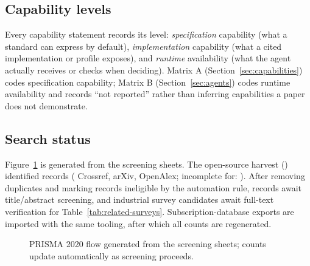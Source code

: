 \subsection{Capability levels}
Every capability statement records its level: \emph{specification} capability (what a
standard can express by default), \emph{implementation} capability (what a cited
implementation or profile exposes), and \emph{runtime} availability (what the agent
actually receives or checks when deciding). Matrix A (Section~\ref{sec:capabilities}) codes
specification capability; Matrix B (Section~\ref{sec:agents}) codes runtime availability
and records ``not reported'' rather than inferring capabilities a paper does not
demonstrate.

\subsection{Search status}
Figure~\ref{fig:prisma} is generated from the screening sheets. The open-source harvest
(\SurveyHarvestDate{}) identified \SurveyIdentified{} records (\SurveyCrossref{} Crossref,
\SurveyArxiv{} arXiv, \SurveyOpenAlex{} OpenAlex; incomplete for: \SurveyFailedSources{}).
After removing \SurveyDuplicates{} duplicates and marking \SurveyAutoExcluded{} records
ineligible by the automation rule, \SurveyUnique{} records await title/abstract
screening, and \SurveyRelatedCandidates{} industrial survey candidates await full-text
verification for Table~\ref{tab:related-surveys}. Subscription-database exports are
imported with the same tooling, after which all counts are regenerated.

\begin{figure}[t]
\centering
\resizebox{\linewidth}{!}{}
\caption{PRISMA 2020 flow generated from the screening sheets; counts update automatically
as screening proceeds.}
\label{fig:prisma}
\end{figure}
